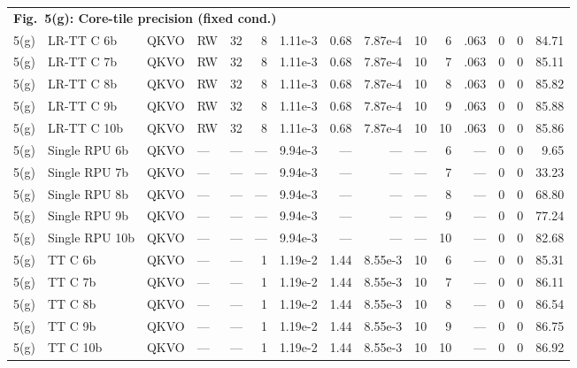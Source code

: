 \documentclass[fleqn,10pt]{wlscirep}
\begin{document}
{\begin{longtable}{@{}l l l l r r r r r r r r r r r@{}}
\multicolumn{15}{l}{\cellcolor{HeadGray}\textbf{Fig.~5(g): Core-tile precision (fixed cond.)}} \\
5(g) & LR-TT C 6b & QKVO & RW & 32 & 8 & 1.11e-3 & 0.68 & 7.87e-4 & 10 & 6 & .063 & 0 & 0 & 84.71 \\
5(g) & LR-TT C 7b & QKVO & RW & 32 & 8 & 1.11e-3 & 0.68 & 7.87e-4 & 10 & 7 & .063 & 0 & 0 & 85.11 \\
5(g) & LR-TT C 8b & QKVO & RW & 32 & 8 & 1.11e-3 & 0.68 & 7.87e-4 & 10 & 8 & .063 & 0 & 0 & 85.82 \\
5(g) & LR-TT C 9b & QKVO & RW & 32 & 8 & 1.11e-3 & 0.68 & 7.87e-4 & 10 & 9 & .063 & 0 & 0 & 85.88 \\
5(g) & LR-TT C 10b & QKVO & RW & 32 & 8 & 1.11e-3 & 0.68 & 7.87e-4 & 10 & 10 & .063 & 0 & 0 & 85.86 \\
5(g) & Single RPU 6b & QKVO & --- & --- & --- & 9.94e-3 & --- & --- & --- & 6 & --- & 0 & 0 & 9.65 \\
5(g) & Single RPU 7b & QKVO & --- & --- & --- & 9.94e-3 & --- & --- & --- & 7 & --- & 0 & 0 & 33.23 \\
5(g) & Single RPU 8b & QKVO & --- & --- & --- & 9.94e-3 & --- & --- & --- & 8 & --- & 0 & 0 & 68.80 \\
5(g) & Single RPU 9b & QKVO & --- & --- & --- & 9.94e-3 & --- & --- & --- & 9 & --- & 0 & 0 & 77.24 \\
5(g) & Single RPU 10b & QKVO & --- & --- & --- & 9.94e-3 & --- & --- & --- & 10 & --- & 0 & 0 & 82.68 \\
5(g) & TT C 6b & QKVO & --- & --- & 1 & 1.19e-2 & 1.44 & 8.55e-3 & 10 & 6 & --- & 0 & 0 & 85.31 \\
5(g) & TT C 7b & QKVO & --- & --- & 1 & 1.19e-2 & 1.44 & 8.55e-3 & 10 & 7 & --- & 0 & 0 & 86.11 \\
5(g) & TT C 8b & QKVO & --- & --- & 1 & 1.19e-2 & 1.44 & 8.55e-3 & 10 & 8 & --- & 0 & 0 & 86.54 \\
5(g) & TT C 9b & QKVO & --- & --- & 1 & 1.19e-2 & 1.44 & 8.55e-3 & 10 & 9 & --- & 0 & 0 & 86.75 \\
5(g) & TT C 10b & QKVO & --- & --- & 1 & 1.19e-2 & 1.44 & 8.55e-3 & 10 & 10 & --- & 0 & 0 & 86.92 \\
\midrule


\end{longtable}}
\end{document}
